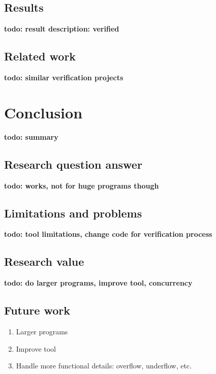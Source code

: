 \documentclass[a4paper]{article}
\newcommand{\todo}[1]{{\color{BurntOrange}\sffamily\textbf{todo: #1}\par}}
\begin{document}
\subsection{Results}
\todo{result description: verified}

\subsection{Related work}
\todo{similar verification projects}


\section{Conclusion}
\todo{summary}

\subsection{Research question answer}
\todo{works, not for huge programs though}

\subsection{Limitations and problems}
\todo{tool limitations, change code for verification process}

\subsection{Research value}
\todo{do larger programs, improve tool, concurrency}

\subsection{Future work}
\begin{enumerate}
	\item Larger programs
	\item Improve tool
	\item Handle more functional details: overflow, underflow, etc.
\end{enumerate}



\end{document}
